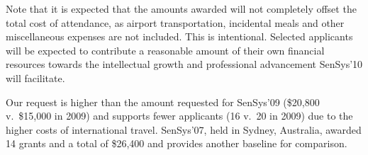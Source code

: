 \documentclass[11pt,letterpaper]{article}
\begin{document}
Note that it is expected that the amounts awarded will not completely offset
the total cost of attendance, as airport transportation, incidental meals and
other miscellaneous expenses are not included. This is intentional. Selected
applicants will be expected to contribute a reasonable amount of their own
financial resources towards the intellectual growth and professional
advancement SenSys'10 will facilitate.

Our request is higher than the amount requested for SenSys'09 (\$20,800
v.~\$15,000 in 2009) and supports fewer applicants (16 v.~20 in 2009) due to
the higher costs of international travel. SenSys'07, held in Sydney,
Australia, awarded 14 grants and a total of \$26,400 and provides another
baseline for comparison.
\end{document}
